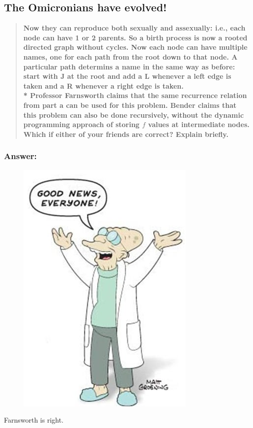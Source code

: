 \documentclass[titlepage]{article}
\theoremstyle{definition}
\begin{document}
  \subsection{The Omicronians have evolved!} 
  \begin{quote}
    \textbf{Now they can reproduce both sexually
    and assexually: i.e., each node can have 1 or 2 parents. So a birth process
    is now a rooted directed graph without cycles. Now each node can have
    multiple names, one for each path from the root down to that node. A
    particular path determins a name in the same way as before: start with J at
    the root and add a L whenever a left edge is taken and a R whenever a right
    edge is taken. \\*
    Professor Farnsworth claims that the same recurrence relation from part a
    can be used for this problem. Bender claims that this problem can also be
    done recursively, without the dynamic programming approach of storing $f$
    values at intermediate nodes. Which if either of your friends are correct?
    Explain briefly.}
  \end{quote}
    \subsubsection{Answer: }
      \begin{figure}
        \centering
          \includegraphics[scale=0.3]{farnsworth}
        \end{figure}
      Farnsworth is right. 
\end{document}
